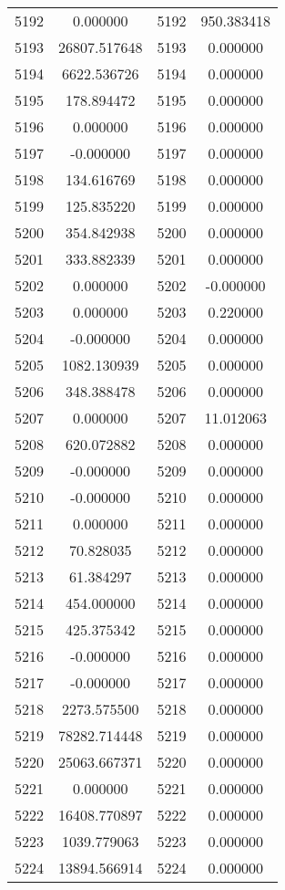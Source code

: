 \documentclass[12pt]{article}
\begin{document}
\begin{longtable}{@{}cccc@{}}
5192 & 0.000000 & 5192 & 950.383418 \\
5193 & 26807.517648 & 5193 & 0.000000 \\
5194 & 6622.536726 & 5194 & 0.000000 \\
5195 & 178.894472 & 5195 & 0.000000 \\
5196 & 0.000000 & 5196 & 0.000000 \\
5197 & -0.000000 & 5197 & 0.000000 \\
5198 & 134.616769 & 5198 & 0.000000 \\
5199 & 125.835220 & 5199 & 0.000000 \\
5200 & 354.842938 & 5200 & 0.000000 \\
5201 & 333.882339 & 5201 & 0.000000 \\
5202 & 0.000000 & 5202 & -0.000000 \\
5203 & 0.000000 & 5203 & 0.220000 \\
5204 & -0.000000 & 5204 & 0.000000 \\
5205 & 1082.130939 & 5205 & 0.000000 \\
5206 & 348.388478 & 5206 & 0.000000 \\
5207 & 0.000000 & 5207 & 11.012063 \\
5208 & 620.072882 & 5208 & 0.000000 \\
5209 & -0.000000 & 5209 & 0.000000 \\
5210 & -0.000000 & 5210 & 0.000000 \\
5211 & 0.000000 & 5211 & 0.000000 \\
5212 & 70.828035 & 5212 & 0.000000 \\
5213 & 61.384297 & 5213 & 0.000000 \\
5214 & 454.000000 & 5214 & 0.000000 \\
5215 & 425.375342 & 5215 & 0.000000 \\
5216 & -0.000000 & 5216 & 0.000000 \\
5217 & -0.000000 & 5217 & 0.000000 \\
5218 & 2273.575500 & 5218 & 0.000000 \\
5219 & 78282.714448 & 5219 & 0.000000 \\
5220 & 25063.667371 & 5220 & 0.000000 \\
5221 & 0.000000 & 5221 & 0.000000 \\
5222 & 16408.770897 & 5222 & 0.000000 \\
5223 & 1039.779063 & 5223 & 0.000000 \\
5224 & 13894.566914 & 5224 & 0.000000 \\

\end{longtable}
\end{document}
